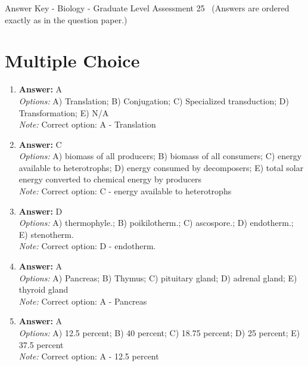 \documentclass[12pt]{article}
\begin{document}
\begin{center}
Answer Key - Biology - Graduate Level Assessment 25 \
\small (Answers are ordered exactly as in the question paper.)
\end{center}

\section*{Multiple Choice}
\begin{enumerate}[label=\arabic*.]
\item \textbf{Answer:} A
\\ \textit{Options:} A) Translation; B) Conjugation; C) Specialized transduction; D) Transformation; E) N/A
\\ \textit{Note:} Correct option: A - Translation
\item \textbf{Answer:} C
\\ \textit{Options:} A) biomass of all producers; B) biomass of all consumers; C) energy available to heterotrophs; D) energy consumed by decomposers; E) total solar energy converted to chemical energy by producers
\\ \textit{Note:} Correct option: C - energy available to heterotrophs
\item \textbf{Answer:} D
\\ \textit{Options:} A) thermophyle.; B) poikilotherm.; C) ascospore.; D) endotherm.; E) stenotherm.
\\ \textit{Note:} Correct option: D - endotherm.
\item \textbf{Answer:} A
\\ \textit{Options:} A) Pancreas; B) Thymus; C) pituitary gland; D) adrenal gland; E) thyroid gland
\\ \textit{Note:} Correct option: A - Pancreas
\item \textbf{Answer:} A
\\ \textit{Options:} A) 12.5 percent; B) 40 percent; C) 18.75 percent; D) 25 percent; E) 37.5 percent
\\ \textit{Note:} Correct option: A - 12.5 percent
\end{enumerate}
\end{document}
